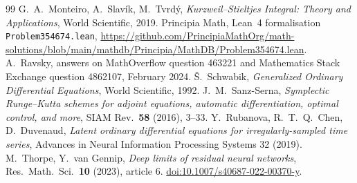 \documentclass[11pt]{article}
\theoremstyle{definition}
\theoremstyle{remark}
\newcommand{\1}{\mathbf{1}}
\begin{document}
\begin{thebibliography}{99}
 G.~A.~Monteiro, A.~Slav\'ik, M.~Tvrd\'y, \emph{Kurzweil--Stieltjes Integral: Theory and
Applications}, World Scientific, 2019.
 Principia Math, Lean~4 formalisation \texttt{Problem354674.lean},
\url{https://github.com/PrincipiaMathOrg/math-solutions/blob/main/mathdb/Principia/MathDB/Problem354674.lean}.
 A.~Ravsky, answers on MathOverflow question 463221 and Mathematics Stack Exchange
question 4862107, February 2024.
 \v{S}.~Schwabik, \emph{Generalized Ordinary Differential Equations}, World Scientific, 1992.
 J.~M.~Sanz-Serna, \emph{Symplectic Runge--Kutta schemes for adjoint equations, automatic
differentiation, optimal control, and more}, SIAM Rev.\ \textbf{58} (2016), 3--33.
 Y.~Rubanova, R.~T.~Q.~Chen, D.~Duvenaud, \emph{Latent ordinary differential equations
for irregularly-sampled time series}, Advances in Neural Information Processing Systems 32 (2019).
 M.~Thorpe, Y.~van Gennip, \emph{Deep limits of residual neural networks},
Res.\ Math.\ Sci.\ \textbf{10} (2023), article 6.
\href{https://doi.org/10.1007/s40687-022-00370-y}{doi:10.1007/s40687-022-00370-y}.
\end{thebibliography}
\end{document}
